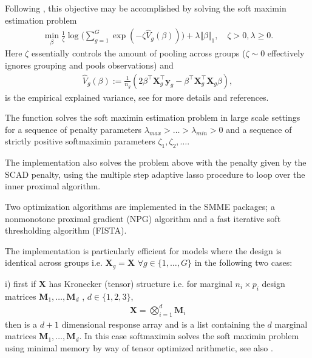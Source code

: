 \documentclass[letterpaper,10pt,english]{sphinxmanual}
\begin{document}
\begin{fulllineitems}
\sphinxAtStartPar
Following , this objective may be accomplished by
solving the soft maximin estimation problem
\begin{equation*}
\begin{split}\min_{\beta}\frac{1}{\zeta}\log\bigg(\sum_{g = 1}^G \exp(-\zeta \hat V_g(\beta))\bigg) + \lambda  \Vert\beta\Vert_1, \quad \zeta > 0,\lambda \geq 0.\end{split}
\end{equation*}
\sphinxAtStartPar
Here \(\zeta\) essentially controls the amount of pooling across groups
(\(\zeta \sim 0\) effectively ignores grouping and pools observations) and
\begin{equation*}
\begin{split}\hat V_g(\beta):=\frac{1}{n_g}(2\beta^\top \mathbf{X}_g^\top \mathbf{y}_g -\beta^\top \mathbf{X}_g^\top \mathbf{X}_g\beta),\end{split}
\end{equation*}
\sphinxAtStartPar
is the empirical explained variance, see  for more
details and references.

\sphinxAtStartPar
The function   solves the soft maximin estimation problem in
large scale settings for a sequence of penalty parameters
\(\lambda_{max}>\ldots >\lambda_{min}>0\) and a sequence of strictly positive
softmaximin  parameters \(\zeta_1, \zeta_2,\ldots\).

\sphinxAtStartPar
The implementation also solves the
problem above with the penalty given by the SCAD penalty, using the multiple
step adaptive lasso procedure to loop over the inner proximal algorithm.

\sphinxAtStartPar
Two optimization algorithms  are implemented in the SMME packages;
a non\sphinxhyphen{}monotone proximal gradient (NPG) algorithm and a fast iterative soft
thresholding algorithm (FISTA).

\sphinxAtStartPar
The implementation is particularly efficient for models where the design is
identical across groups i.e. \(\mathbf{X}_g = \mathbf{X}\)
\(\forall g \in \{1, \ldots, G\}\) in the following two cases:

\sphinxAtStartPar
i) first if \(\mathbf{X}\) has Kronecker (tensor) structure i.e. for marginal \(n_i\times p_i\) design matrices \(\mathbf{M}_1,\ldots, \mathbf{M}_d\)
, \(d \in \{ 1, 2, 3\}\),
\begin{equation*}
\begin{split}\mathbf{X} = \bigotimes_{i=1}^d \mathbf{M}_i \end{split}
\end{equation*}
\sphinxAtStartPar
then  is a \(d + 1\) dimensional response array
and     is a list containing the \(d\) marginal matrices
\(\mathbf{M}_1,\ldots, \mathbf{M}_d\). In this case  softmaximin solves
the soft maximin problem using minimal memory by way of tensor optimized
arithmetic, see also   .


\end{fulllineitems}
\end{document}
